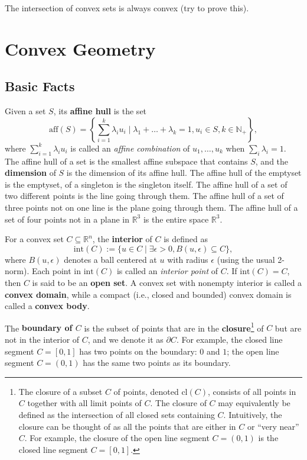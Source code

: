 \documentclass[
]{book}
\theoremstyle{definition}
\theoremstyle{definition}
\theoremstyle{definition}
\theoremstyle{definition}
\theoremstyle{remark}
\begin{document}
The intersection of convex sets is always convex (try to prove this).

\section{Convex Geometry}\label{background:convex:geometry}

\subsection{Basic Facts}\label{basic-facts}

Given a set \(S\), its \textbf{affine hull} is the set
\[
\mathrm{aff}(S) =  \left\{  \sum_{i=1}^k \lambda_i u_i \mid \lambda_1 + \dots + \lambda_k = 1, u_i \in S, k \in \mathbb{N}_{+}  \right\} ,
\]
where \(\sum_{i=1}^{k} \lambda_i u_i\) is called an \emph{affine combination} of \(u_1,\dots,u_k\) when \(\sum_i \lambda_i = 1\). The affine hull of a set is the smallest affine subspace that contains \(S\), and the \textbf{dimension} of \(S\) is the dimension of its affine hull. The affine hull of the emptyset is the emptyset, of a singleton is the singleton itself. The affine hull of a set of two different points is the line going through them. The affine hull of a set of three points not on one line is the plane going through them. The affine hull of a set of four points not in a plane in \(\mathbb{R}^{3}\) is the entire space \(\mathbb{R}^{3}\).

For a convex set \(C \subseteq \mathbb{R}^{n}\), the \textbf{interior} of \(C\) is defined as
\[
\mathrm{int}(C) := \{  u \in C \mid \exists \epsilon > 0, B(u,\epsilon) \subseteq C  \},
\]
where \(B(u,\epsilon)\) denotes a ball centered at \(u\) with radius \(\epsilon\) (using the usual 2-norm). Each point in \(\mathrm{int}(C)\) is called an \emph{interior point} of \(C\). If \(\mathrm{int}(C) = C\), then \(C\) is said to be an \textbf{open set}. A convex set with nonempty interior is called a \textbf{convex domain}, while a compact (i.e., closed and bounded) convex domain is called a \textbf{convex body}.

The \textbf{boundary of \(C\)} is the subset of points that are in the \textbf{closure}\footnote{The closure of a subset \(C\) of points, denoted \(\mathrm{cl}(C)\), consists of all points in \(C\) together with all limit points of \(C\). The closure of \(C\) may equivalently be defined as the intersection of all closed sets containing \(C\). Intuitively, the closure can be thought of as all the points that are either in \(C\) or ``very near'' \(C\). For example, the closure of the open line segment \(C= (0,1)\) is the closed line segment \(C=[0,1]\).} of \(C\) but are not in the interior of \(C\), and we denote it as \(\partial C\). For example, the closed line segment \(C = [0,1]\) has two points on the boundary: \(0\) and \(1\); the open line segment \(C = (0,1)\) has the same two points as its boundary.
\end{document}
